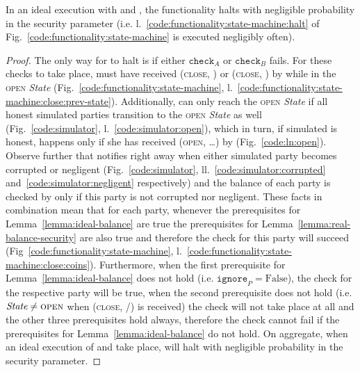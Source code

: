 \begin{lemma}[No halt]
\label{lemma:no-halt}
  In an ideal execution with \fchan and \simulator, the functionality halts with
  negligible probability in the security parameter (i.e.
  l.~\ref{code:functionality:state-machine:halt} of
  Fig.~\ref{code:functionality:state-machine} is executed negligibly often).
\end{lemma}

\begin{proof}
  The only way for \fchan to halt is if either $\texttt{check}_A$ or
  $\texttt{check}_B$ fails. For these checks to take place, \fchan must have
  received (\textsc{close}, \alice) or (\textsc{close}, \bob) by \simulator
  while in the \textsc{open} \textit{State}
  (Fig.~\ref{code:functionality:state-machine},
  l.~\ref{code:functionality:state-machine:close:prev-state}). Additionally,
  \fchan can only reach the \textsc{open} \textit{State} if all honest simulated
  parties transition to the \textsc{open} \textit{State} as well
  (Fig.~\ref{code:simulator}, l.~\ref{code:simulator:open}), which in turn, if
  simulated \alice is honest, happens only if she has received (\textsc{open},
  \dots) by \environment (Fig.~\ref{code:ln:open}). Observe further that
  \simulator notifies \fchan right away when either simulated party becomes
  corrupted or negligent (Fig.~\ref{code:simulator},
  ll.~\ref{code:simulator:corrupted} and~\ref{code:simulator:negligent}
  respectively) and the balance of each party is checked by \fchan only if this
  party is not corrupted nor negligent. These facts in combination mean that for
  each party, whenever the prerequisites for Lemma~\ref{lemma:ideal-balance} are
  true the prerequisites for Lemma~\ref{lemma:real-balance-security} are also
  true and therefore the check for this party will succeed
  (Fig~\ref{code:functionality:state-machine},
  l.~\ref{code:functionality:state-machine:close:coins}). Furthermore, when the
  first prerequisite for Lemma~\ref{lemma:ideal-balance} does not hold (i.e.
  $\texttt{ignore}_P = \mathrm{False}$), the check for the respective party will
  be true, when the second prerequisite does not hold (i.e. $\textit{State} \neq
  \textsc{open}$ when (\textsc{close}, \alice/\bob) is received) the check will
  not take place at all and the other three prerequisites hold always, therefore
  the check cannot fail if the prerequisites for Lemma~\ref{lemma:ideal-balance}
  do not hold. On aggregate, when an ideal execution of \fchan and \simulator
  take place, \fchan will halt with negligible probability in the security
  parameter.
\end{proof}
